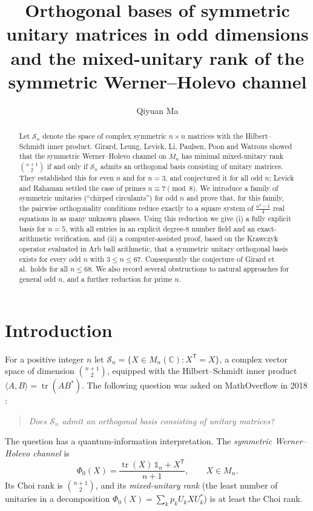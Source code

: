 \documentclass[11pt]{amsart}
\title[Symmetric unitary orthogonal bases in odd dimensions]{Orthogonal bases of symmetric unitary matrices in odd dimensions and the mixed-unitary rank of the symmetric Werner--Holevo channel}
\author{Qiyuan Ma}
\date{}
\theoremstyle{definition}
\theoremstyle{remark}
\newcommand{\C}{\mathbb{C}}
\newcommand{\tr}{\operatorname{tr}}
\newcommand{\Sym}{\mathcal{S}}
\newcommand{\ip}[2]{\langle #1,#2\rangle}
\begin{document}
\begin{abstract}
Let $\Sym_n$ denote the space of complex symmetric $n\times n$ matrices with the Hilbert--Schmidt inner product. Girard, Leung, Levick, Li, Paulsen, Poon and Watrous showed that the symmetric Werner--Holevo channel on $M_n$ has minimal mixed-unitary rank $\binom{n+1}{2}$ if and only if $\Sym_n$ admits an orthogonal basis consisting of unitary matrices. They established this for even $n$ and for $n=3$, and conjectured it for all odd $n$; Levick and Rahaman settled the case of primes $n\equiv 7 \pmod 8$.
We introduce a family of symmetric unitaries (``chirped circulants'') for odd $n$ and prove that, for this family, the pairwise orthogonality conditions reduce exactly to a square system of $\frac{n^2-1}{4}$ real equations in as many unknown phases.
Using this reduction we give (i) a fully explicit basis for $n=5$, with all entries in an explicit degree-$8$ number field and an exact-arithmetic verification, and (ii) a computer-assisted proof, based on the Krawczyk operator evaluated in Arb ball arithmetic, that a symmetric unitary orthogonal basis exists for every odd $n$ with $3\le n\le 67$. Consequently the conjecture of Girard et al.\ holds for all $n\le 68$. We also record several obstructions to natural approaches for general odd $n$, and a further reduction for prime $n$.
\end{abstract}

\maketitle

\section{Introduction}

For a positive integer $n$ let $\Sym_n=\{X\in M_n(\C): X^{\mathsf T}=X\}$, a complex vector space of dimension $\binom{n+1}{2}$, equipped with the Hilbert--Schmidt inner product $\ip{A}{B}=\tr(AB^*)$. The following question was asked on MathOverflow in 2018 \cite{MO316985}:

\begin{quote}
\emph{Does $\Sym_n$ admit an orthogonal basis consisting of unitary matrices?}
\end{quote}

The question has a quantum-information interpretation. The \emph{symmetric Werner--Holevo channel} \cite{WH02} is
\[
\Phi_0(X)=\frac{\tr(X)\,\mathbb{1}_n+X^{\mathsf T}}{n+1},\qquad X\in M_n .
\]
Its Choi rank is $\binom{n+1}{2}$, and its \emph{mixed-unitary rank} (the least number of unitaries in a decomposition $\Phi_0(X)=\sum_k p_kU_kXU_k^*$) is at least the Choi rank.
\end{document}
